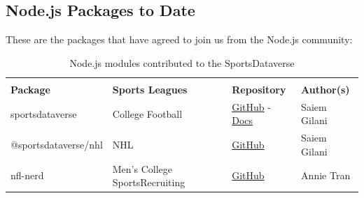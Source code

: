 \documentclass[12pt]{article}
\begin{document}
\subsection{Node.js Packages to Date}
These are the packages that have agreed to join us from the Node.js community:

\begin{table}[!htbp]
\centering
\renewcommand{\arraystretch}{1.3}
\begin{tabular}{>{\raggedright}m{1.0in} >{\raggedright}m{2.2in} >{\centering}m{0.8in} >{\raggedright\arraybackslash}m{2.0in}}
\toprule
\multicolumn{4}{c}{\textbf{Node.js Packages in the SportsDataverse}} \\
\textbf{Package} & \textbf{Sports Leagues} & \textbf{Repository} & \textbf{Author(s)} \\ 
 \midrule
    sportsdataverse & College Football & \href{https://github.com/saiemgilani/sportsdataverse/}{GitHub} - \href{https://saiemgilani.github.io/sportsdataverse}{Docs} & Saiem Gilani\\
    @sportsdataverse/nhl & NHL & \href{https://github.com/saiemgilani/sportsdataverse-nhl/}{GitHub} & Saiem Gilani \\
    nfl-nerd & Men's College SportsRecruiting & \href{https://github.com/nntrn/nfl-nerd/}{GitHub} & Annie Tran \\
\end{tabular}
\vspace{5pt}
\caption{Node.js modules contributed to the SportsDataverse}
\label{tbl:sdvjs}
\vspace{-5mm}
\end{table}
\end{document}
